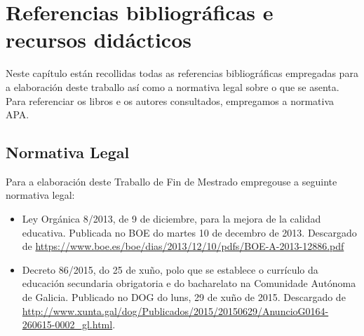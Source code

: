 \chapter{Referencias bibliográficas e recursos didácticos}

Neste capítulo están recollidas todas as referencias bibliográficas empregadas para a elaboración deste traballo así como a normativa legal sobre o que se asenta. Para referenciar os libros e os autores consultados, empregamos a normativa APA.

\nocite{*}  %




\section{Normativa Legal}
Para a elaboración deste Traballo de Fin de Mestrado empregouse a seguinte normativa legal:
\sloppy
\begin{itemize}
    \item Ley Orgánica 8/2013, de 9 de diciembre, para la mejora de la calidad educativa. Publicada no BOE do martes 10 de decembro de 2013. Descargado de \href{https://www.boe.es/boe/dias/2013/12/10/pdfs/BOE-A-2013-12886.pdf}{https://www.boe.es/boe/dias/2013/12/10/pdfs/BOE-A-2013-12886.pdf}
    \item Decreto 86/2015, do 25 de xuño, polo que se establece o currículo da educación secundaria obrigatoria e do bacharelato na Comunidade Autónoma de Galicia. Publicado no DOG do luns, 29 de xuño de 2015. Descargado de \href{http://www.xunta.gal/dog/Publicados/2015/20150629/AnuncioG0164-260615-0002\_gl.html}{http://www.xunta.gal/dog/Publicados/2015/20150629/AnuncioG0164-260615-0002\_gl.html}.
\end{itemize}
